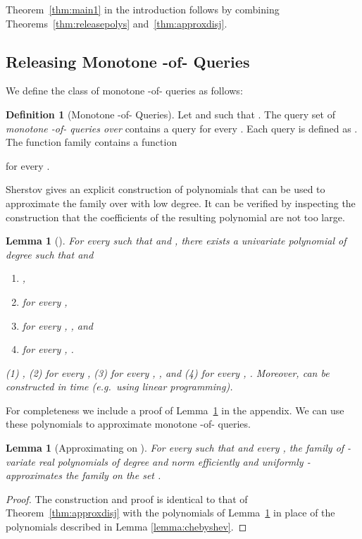 \documentclass[11pt]{article}
\newtheorem{lemma}[theorem]{Lemma}
\theoremstyle{definition}
\newtheorem{definition}[theorem]{Definition}
\begin{document}
Theorem~\ref{thm:main1} in the introduction follows by combining Theorems~\ref{thm:releasepolys} and~\ref{thm:approxdisj}.


\subsection{Releasing Monotone -of- Queries}
We define the class of monotone -of- queries as follows:

\begin{definition}[Monotone -of- Queries] Let  and  such that .
The query set  of \emph{monotone -of- queries over } contains a query  for every .  Each query is defined as .
The  function family  contains a function

for every .
\end{definition}

\ifnum{}
Sherstov \cite[Lemma 3.11]{Sherstov09} gives an explicit construction of polynomials that can be used to approximate the family  over  with low degree.
It can be verified by inspecting the construction that the coefficients of the resulting polynomial are not too large.


\begin{lemma}[\cite{Sherstov09}] \label{lemma:paturi}
For every  such that  and , there exists a univariate polynomial  of degree  such that  and
\ifnum{}
\begin{enumerate}
\item ,
\item for every ,
\item for every , , and
\item for every , .
\end{enumerate}
\else
(1) ,
(2) for every ,
(3) for every , , and
(4) for every , .
\fi
Moreover,  can be constructed in time  (e.g.~using linear programming).
\end{lemma}
For completeness we include a proof of Lemma~\ref{lemma:paturi} in the appendix.
We can use these polynomials to approximate monotone -of- queries.

\begin{lemma}[Approximating  on ] \label{thm:approx2}
For every  such that  and every , the family  of -variate real polynomials of degree  and norm  efficiently and uniformly -approximates the family  on the set .
\end{lemma}
\begin{proof}
The construction and proof is identical to that of Theorem~\ref{thm:approxdisj} with the polynomials of Lemma~\ref{lemma:paturi} in place of the polynomials described in Lemma \ref{lemma:chebyshev}.
\end{proof}
\end{document}
